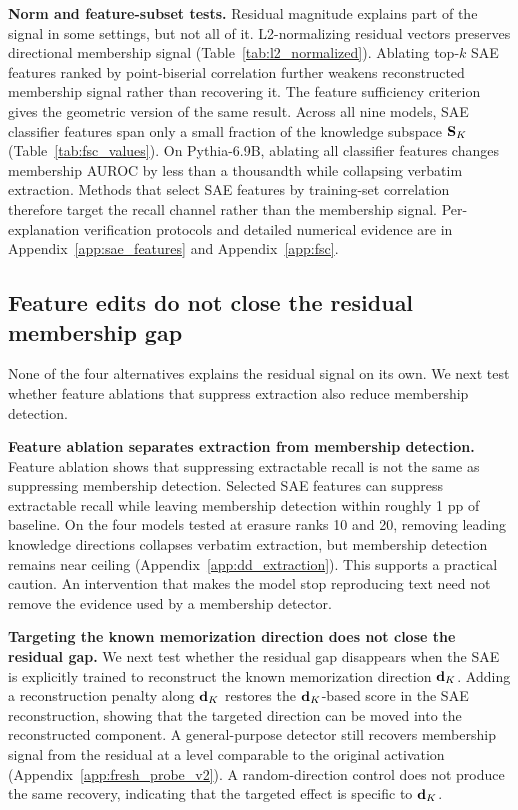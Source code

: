 \textbf{Norm and feature-subset tests.}
Residual magnitude explains part of the signal in some settings, but not all of it. L2-normalizing residual vectors preserves directional membership signal (Table~\ref{tab:l2_normalized}). Ablating top-$k$ SAE features ranked by point-biserial correlation further weakens reconstructed membership signal rather than recovering it. The feature sufficiency criterion gives the geometric version of the same result. Across all nine models, SAE classifier features span only a small fraction of the knowledge subspace $\mathbf{S}_K$ (Table~\ref{tab:fsc_values}). On Pythia-6.9B, ablating all classifier features changes membership AUROC by less than a thousandth while collapsing verbatim extraction. Methods that select SAE features by training-set correlation~\citep{wang2025sspu,frikha2025privacyscalpel,muhamed2025dsg} therefore target the recall channel rather than the membership signal. Per-explanation verification protocols and detailed numerical evidence are in Appendix~\ref{app:sae_features} and Appendix~\ref{app:fsc}.

\subsection{Feature edits do not close the residual membership gap}
\label{sec:results:interventions}

None of the four alternatives explains the residual signal on its own. We next test whether feature ablations that suppress extraction also reduce membership detection.

\textbf{Feature ablation separates extraction from membership detection.}
Feature ablation shows that suppressing extractable recall is not the same as suppressing membership detection. Selected SAE features can suppress extractable recall while leaving membership detection within roughly 1 pp of baseline. On the four models tested at erasure ranks 10 and 20, removing leading
knowledge directions collapses verbatim extraction, but membership detection remains near ceiling (Appendix~\ref{app:dd_extraction}). This supports a
practical caution. An intervention that makes the model stop reproducing text need not remove the evidence used by a membership detector.

\textbf{Targeting the known memorization direction does not close the residual gap.}
We next test whether the residual gap disappears when the SAE is explicitly trained to reconstruct the known memorization direction $\mathbf{d}_K$. Adding a
reconstruction penalty along $\mathbf{d}_K$ restores the $\mathbf{d}_K$-based score in the SAE reconstruction, showing that the targeted direction can be moved into the
reconstructed component. A general-purpose detector still recovers membership signal from the residual at a level comparable to the original activation
(Appendix~\ref{app:fresh_probe_v2}). A random-direction control does not produce the same recovery, indicating that the targeted effect is specific to $
\mathbf{d}_K$.

